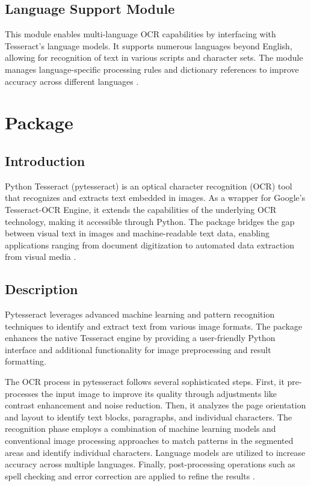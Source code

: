 \documentclass{article}
\begin{document}
	\subsection{Language Support Module}
	This module enables multi-language OCR capabilities by interfacing with Tesseract's language models. It supports numerous languages beyond English, allowing for recognition of text in various scripts and character sets. The module manages language-specific processing rules and dictionary references to improve accuracy across different languages \cite {Betterpath:2023, Anitha:2024}.
	
	\section{Package}
	
	\subsection{Introduction}
	Python Tesseract (pytesseract) is an optical character recognition (OCR) tool that recognizes and extracts text embedded in images. As a wrapper for Google's Tesseract-OCR Engine, it extends the capabilities of the underlying OCR technology, making it accessible through Python. The package bridges the gap between visual text in images and machine-readable text data, enabling applications ranging from document digitization to automated data extraction from visual media \cite {DataCamp:2024, Betterpath:2023}.
	
	\subsection{Description}
	Pytesseract leverages advanced machine learning and pattern recognition techniques to identify and extract text from various image formats. The package enhances the native Tesseract engine by providing a user-friendly Python interface and additional functionality for image preprocessing and result formatting.
	
	The OCR process in pytesseract follows several sophisticated steps. First, it pre-processes the input image to improve its quality through adjustments like contrast enhancement and noise reduction. Then, it analyzes the page orientation and layout to identify text blocks, paragraphs, and individual characters. The recognition phase employs a combination of machine learning models and conventional image processing approaches to match patterns in the segmented areas and identify individual characters. Language models are utilized to increase accuracy across multiple languages. Finally, post-processing operations such as spell checking and error correction are applied to refine the results \cite {DataCamp:2024, GeekyAnts:2023}.
	
\end{document}

